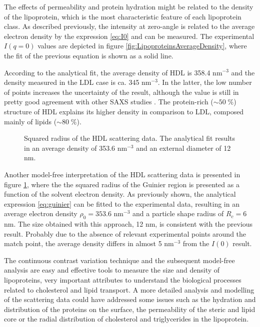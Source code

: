 The effects of permeability and protein hydration might be related to the density of the lipoprotein, which is the most characteristic feature of each lipoprotein class. As described previously, the intensity at zero-angle is related to the average electron density by the expression \ref{eq:I0} and can be measured. The experimental $I(q=0)$ values are depicted in figure \ref{fig:LipoproteinsAverageDensity}, where the fit of the previous equation is shown as a solid line. 

According to the analytical fit, the average density of HDL is 358.4 nm$^{-3}$ and the density measured in the LDL case is ca. 345 nm$^{-3}$. In the latter, the low number of points increases the uncertainty of the result, although the value is still in pretty good agreement with other SAXS studies \citep{tardieu_structure_1976,luzzati_structure_1979}. The protein-rich ($\sim 50 \; \% $) structure of HDL explains its higher density in comparison to LDL, composed mainly of lipids ($\sim 80 \; \% $). 

\begin{figure}
	\centering
		
		\caption[Squared radius of the HDL scattering data.]{Squared radius of the HDL scattering data. The analytical fit results in an average density of 353.6 nm$^{-3}$ and an external diameter of 12 nm.}
		\label{fig:HDLGuinierRadius}
\end{figure}

Another model-free interpretation of the HDL scattering data is presented in figure \ref{fig:HDLGuinierRadius}, where the the squared radius of the Guinier region is presented as a function of the solvent electron density. As previously shown, the analytical expression \ref{eq:guinier} can be fitted to the experimental data, resulting in an average electron density $\rho_0=353.6$ nm$^{-3}$ and a particle shape radius of $R_c=6$ nm. The size obtained with this approach, 12 nm, is consistent with the previous result. Probably due to the absence of relevant experimental points around the match point, the average density differs in almost 5 nm$^{-3}$ from the $I(0)$ result.

The continuous contrast variation technique and the subsequent model-free analysis are easy and effective tools to measure the size and density of lipoproteins, very important attributes to understand the biological processes related to cholesterol and lipid transport. A more detailed analysis and modelling of the scattering data could have addressed some issues such as the hydration and distribution of the proteins on the surface, the permeability of the steric and lipid core or the radial distribution of cholesterol and triglycerides in the lipoprotein.


